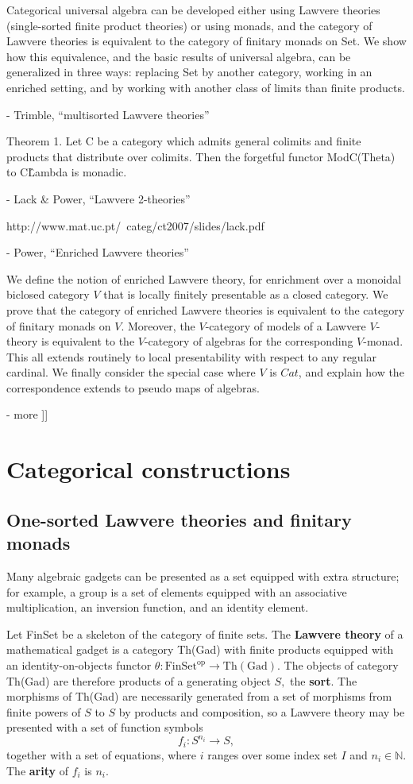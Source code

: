 \documentclass{article}
\newcommand{\maps}{\colon}
\newcommand{\FinSet}{\mathrm{FinSet}}
\newcommand{\op}{\mathrm{op}}
\newcommand{\NN}{\mathbb{N}}
\begin{document}
  Categorical universal algebra can be developed either using Lawvere theories (single-sorted finite product theories) or using monads, and the category of Lawvere theories is equivalent to the category of finitary monads on Set. We show how this equivalence, and the basic results of universal algebra, can be generalized in three ways: replacing Set by another category, working in an enriched setting, and by working with another class of limits than finite products.
  
- Trimble, ``multisorted Lawvere theories''

  Theorem 1. Let C be a category which admits general colimits and finite products that distribute over colimits. Then the forgetful functor ModC(Theta) to C\^Lambda is monadic.

- Lack \& Power, ``Lawvere 2-theories''

  http://www.mat.uc.pt/~categ/ct2007/slides/lack.pdf

- Power, ``Enriched Lawvere theories''

  We define the notion of enriched Lawvere theory, for enrichment over a monoidal biclosed category $V$ that is locally finitely presentable as a closed category. We prove that the category of enriched Lawvere theories is equivalent to the category of finitary monads on $V$. Moreover, the $V$-category of models of a Lawvere $V$-theory is equivalent to the $V$-category of algebras for the corresponding $V$-monad. This all extends routinely to local presentability with respect to any regular cardinal. We finally consider the special case where $V$ is $Cat$, and explain how the correspondence extends to pseudo maps of algebras.

- more
]]

\section{Categorical constructions}

\subsection{One-sorted Lawvere theories and finitary monads}

Many algebraic gadgets can be presented as a set equipped with extra structure; for example, a group is a set of elements equipped with an associative multiplication, an inversion function, and an identity element.

Let FinSet be a skeleton of the category of finite sets.  The {\bf Lawvere theory} of a mathematical gadget is a category Th(Gad) with finite products equipped with an identity-on-objects functor $\theta\maps \FinSet^\op \to \mathrm{Th(Gad)}.$  The objects of category Th(Gad) are therefore products of a generating object $S,$ the {\bf sort}.  The morphisms of Th(Gad) are necessarily generated from a set of morphisms from finite powers of $S$ to $S$ by products and composition, so a Lawvere theory may be presented with a set of function symbols
\[ f_i\maps S^{n_i} \to S, \]
together with a set of equations, where $i$ ranges over some index set $I$ and $n_i \in \NN$.  The {\bf arity} of $f_i$ is $n_i.$
\end{document}
